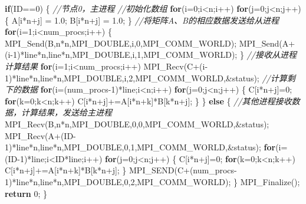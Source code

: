 \documentclass[]{ctexbook}
\newenvironment{Shaded}{\begin{snugshade}}{\end{snugshade}}
\newcommand{\CommentTok}[1]{\textcolor[rgb]{0.56,0.35,0.01}{\textit{#1}}}
\newcommand{\ControlFlowTok}[1]{\textcolor[rgb]{0.13,0.29,0.53}{\textbf{#1}}}
\newcommand{\DecValTok}[1]{\textcolor[rgb]{0.00,0.00,0.81}{#1}}
\newcommand{\FloatTok}[1]{\textcolor[rgb]{0.00,0.00,0.81}{#1}}
\newcommand{\NormalTok}[1]{#1}
\begin{document}
\begin{Shaded}
\begin{Highlighting}[]
    \ControlFlowTok{if}\NormalTok{(ID==}\DecValTok{0}\NormalTok{) \{ }\CommentTok{//节点0，主进程}
        \CommentTok{//初始化数组}
        \ControlFlowTok{for}\NormalTok{(i=}\DecValTok{0}\NormalTok{;i\textless{}n;i++)}
            \ControlFlowTok{for}\NormalTok{(j=}\DecValTok{0}\NormalTok{;j\textless{}n;j++)\{ }
\NormalTok{                A[i*n+j] = }\FloatTok{1.0}\NormalTok{;}
\NormalTok{                B[i*n+j] = }\FloatTok{1.0}\NormalTok{;}
\NormalTok{            \}}
        \CommentTok{//将矩阵A、B的相应数据发送给从进程}
        \ControlFlowTok{for}\NormalTok{(i=}\DecValTok{1}\NormalTok{;i\textless{}num\_procs;i++) \{}
\NormalTok{            MPI\_Send(B,n*n,MPI\_DOUBLE,i,}\DecValTok{0}\NormalTok{,MPI\_COMM\_WORLD);}
\NormalTok{            MPI\_Send(A+(i{-}}\DecValTok{1}\NormalTok{)*line*n,line*n,MPI\_DOUBLE,i,}\DecValTok{1}\NormalTok{,MPI\_COMM\_WORLD);}
\NormalTok{        \}}
        \CommentTok{//接收从进程计算结果}
        \ControlFlowTok{for}\NormalTok{(i=}\DecValTok{1}\NormalTok{;i\textless{}num\_procs;i++) }
\NormalTok{            MPI\_Recv(C+(i{-}}\DecValTok{1}\NormalTok{)*line*n,line*n,MPI\_DOUBLE,i,}\DecValTok{2}\NormalTok{,MPI\_COMM\_WORLD,\&status);}
        \CommentTok{//计算剩下的数据}
        \ControlFlowTok{for}\NormalTok{(i=(num\_procs{-}}\DecValTok{1}\NormalTok{)*line;i\textless{}n;i++) }
            \ControlFlowTok{for}\NormalTok{(j=}\DecValTok{0}\NormalTok{;j\textless{}n;j++) \{}
\NormalTok{                C[i*n+j]=}\DecValTok{0}\NormalTok{;}
                \ControlFlowTok{for}\NormalTok{(k=}\DecValTok{0}\NormalTok{;k\textless{}n;k++)}
\NormalTok{                    C[i*n+j]+=A[i*n+k]*B[k*n+j];}
\NormalTok{            \}}
\NormalTok{    \} }\ControlFlowTok{else}\NormalTok{ \{}
        \CommentTok{//其他进程接收数据，计算结果，发送给主进程}
\NormalTok{        MPI\_Recv(B,n*n,MPI\_DOUBLE,}\DecValTok{0}\NormalTok{,}\DecValTok{0}\NormalTok{,MPI\_COMM\_WORLD,\&status);}
\NormalTok{        MPI\_Recv(A+(ID{-}}\DecValTok{1}\NormalTok{)*line*n,line*n,MPI\_DOUBLE,}\DecValTok{0}\NormalTok{,}\DecValTok{1}\NormalTok{,MPI\_COMM\_WORLD,\&status);}
        \ControlFlowTok{for}\NormalTok{(i=(ID{-}}\DecValTok{1}\NormalTok{)*line;i\textless{}ID*line;i++)}
            \ControlFlowTok{for}\NormalTok{(j=}\DecValTok{0}\NormalTok{;j\textless{}n;j++) \{}
\NormalTok{                C[i*n+j]=}\DecValTok{0}\NormalTok{;}
                \ControlFlowTok{for}\NormalTok{(k=}\DecValTok{0}\NormalTok{;k\textless{}n;k++)}
\NormalTok{                    C[i*n+j]+=A[i*n+k]*B[k*n+j];}
\NormalTok{            \}}
\NormalTok{        MPI\_SEND(C+(num\_procs{-}}\DecValTok{1}\NormalTok{)*line*n,line*n,MPI\_DOUBLE,}\DecValTok{0}\NormalTok{,}\DecValTok{2}\NormalTok{,MPI\_COMM\_WORLD);}
\NormalTok{    \}}
\NormalTok{    MPI\_Finalize();}
    \ControlFlowTok{return} \DecValTok{0}\NormalTok{;}
\NormalTok{\}}
\end{Highlighting}
\end{Shaded}
\end{document}
